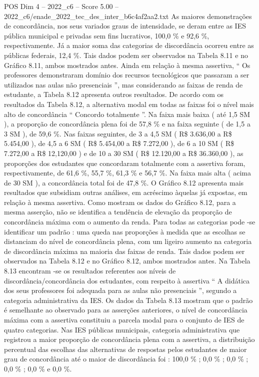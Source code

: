 \begin{textsample}{POS Dim 4 – 2022\_c6 – Score 5.00 – 2022\_c6/enade\_2022\_tec\_des\_inter\_b6c4af2aa2.txt}
As maiores demonstrações de concordância, nos seus variados graus de intensidade, se deram entre as IES pública municipal e privadas sem fins lucrativos, 100,0 \% e 92,6 \%, respectivamente.
Já a maior soma das categorias de discordância ocorreu entre as públicas federais, 12,4 \%.
Tais dados podem ser observados na Tabela 8.11 e no Gráfico 8.11, ambos mostrados antes.
Ainda em relação à mesma assertiva, “ Os professores demonstraram domínio dos recursos tecnológicos que passaram a ser utilizados nas aulas não presenciais ”, mas considerando as faixas de renda de estudante, a Tabela 8.12 apresenta outros resultados.
De acordo com os resultados da Tabela 8.12, a alternativa modal em todas as faixas foi o nível mais alto de concordância “ Concordo totalmente ”.
Na faixa mais baixa ( até 1,5 SM ), a proporção de concordância plena foi de 57,8 \% e na faixa seguinte ( de 1,5 a 3 SM ), de 59,6 \%.
Nas faixas seguintes, de 3 a 4,5 SM ( R\$ 3.636,00 a R\$ 5.454,00 ), de 4,5 a 6 SM ( R\$ 5.454,00 a R\$ 7.272,00 ), de 6 a 10 SM ( R\$ 7.272,00 a R\$ 12,120,00 ) e de 10 a 30 SM ( R\$ 12.120,00 a R\$ 36.360,00 ), as proporções dos estudantes que concordaram totalmente com a assertiva foram, respectivamente, de 61,6 \%, 55,7 \%, 61,3 \% e 56,7 \%.
Na faixa mais alta ( acima de 30 SM ), a concordância total foi de 47,8 \%.
O Gráfico 8.12 apresenta mais resultados que subsidiam outras análises, em acréscimo àquelas já expostas, em relação à mesma assertiva.
Como mostram os dados do Gráfico 8.12, para a mesma asserção, não se identifica a tendência de elevação da proporção de concordância máxima com o aumento da renda.
Para todas as categorias pode -se identificar um padrão : uma queda nas proporções à medida que as escolhas se distanciam do nível de concordância plena, com um ligeiro aumento na categoria de discordância máxima na maioria das faixas de renda.
Tais dados podem ser observados na Tabela 8.12 e no Gráfico 8.12, ambos mostrados antes.
Na Tabela 8.13 encontram -se os resultados referentes aos níveis de discordância/concordância dos estudantes, com respeito à assertiva “ A didática dos seus professores foi adequada para as aulas não presenciais ”, segundo a categoria administrativa da IES.
Os dados da Tabela 8.13 mostram que o padrão é semelhante ao observado para as asserções anteriores, o nível de concordância máxima com a assertiva constituiu a parcela modal para o conjunto de IES de quatro categorias.
Nas IES públicas municipais, categoria administrativa que registrou a maior proporção de concordância plena com a assertiva, a distribuição percentual das escolhas das alternativas de respostas pelos estudantes de maior grau de concordância até o maior de discordância foi : 100,0 \% ; 0,0 \% ; 0,0 \% ; 0,0 \% ; 0,0 \% e 0,0 \%.

\end{textsample}
